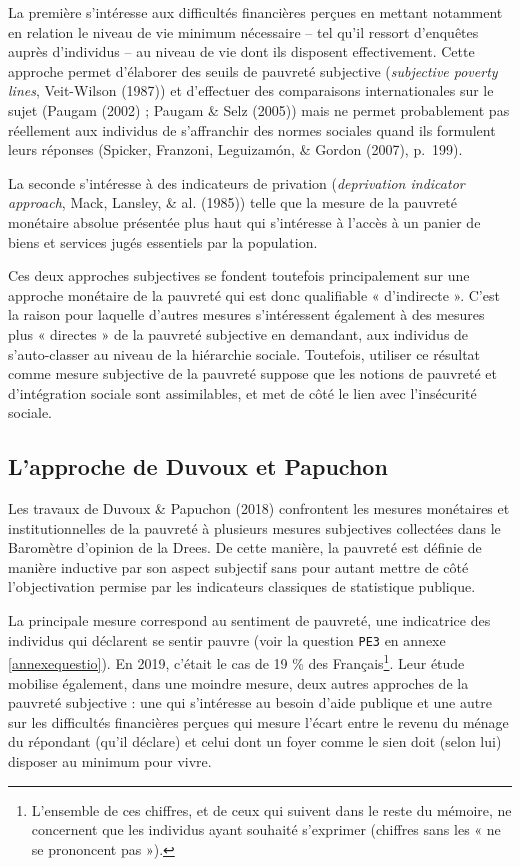 \documentclass[12pt,a4paper]{reedthesis}
\begin{document}
La première s'intéresse aux difficultés financières perçues en mettant notamment en relation le niveau de vie minimum nécessaire -- tel qu'il ressort d'enquêtes auprès d'individus -- au niveau de vie dont ils disposent effectivement. Cette approche permet d'élaborer des seuils de pauvreté subjective (\emph{subjective poverty lines}, Veit-Wilson (1987)) et d'effectuer des comparaisons internationales sur le sujet (Paugam (2002) ; Paugam \& Selz (2005)) mais ne permet probablement pas réellement aux individus de s'affranchir des normes sociales quand ils formulent leurs réponses (Spicker, Franzoni, Leguizamón, \& Gordon (2007), p.~199).

La seconde s'intéresse à des indicateurs de privation (\emph{deprivation indicator approach}, Mack, Lansley, \& al. (1985)) telle que la mesure de la pauvreté monétaire absolue présentée plus haut qui s'intéresse à l'accès à un panier de biens et services jugés essentiels par la population.

Ces deux approches subjectives se fondent toutefois principalement sur une approche monétaire de la pauvreté qui est donc qualifiable « d'indirecte ». C'est la raison pour laquelle d'autres mesures s'intéressent également à des mesures plus « directes » de la pauvreté subjective en demandant, aux individus de s'auto-classer au niveau de la hiérarchie sociale. Toutefois, utiliser ce résultat comme mesure subjective de la pauvreté suppose que les notions de pauvreté et d'intégration sociale sont assimilables, et met de côté le lien avec l'insécurité sociale.

\hypertarget{sec:approcheduvoux}{%
\subsection{L'approche de Duvoux et Papuchon}\label{sec:approcheduvoux}}

Les travaux de Duvoux \& Papuchon (2018) confrontent les mesures monétaires et institutionnelles de la pauvreté à plusieurs mesures subjectives collectées dans le Baromètre d'opinion de la Drees. De cette manière, la pauvreté est définie de manière inductive par son aspect subjectif sans pour autant mettre de côté l'objectivation permise par les indicateurs classiques de statistique publique.

La principale mesure correspond au sentiment de pauvreté, une indicatrice des individus qui déclarent se sentir pauvre (voir la question \texttt{PE3} en annexe \ref{annexequestio}). En 2019, c'était le cas de 19 \% des Français\footnote{L'ensemble de ces chiffres, et de ceux qui suivent dans le reste du mémoire, ne concernent que les individus ayant souhaité s'exprimer (chiffres sans les « ne se prononcent pas »).}. Leur étude mobilise également, dans une moindre mesure, deux autres approches de la pauvreté subjective : une qui s'intéresse au besoin d'aide publique et une autre sur les difficultés financières perçues qui mesure l'écart entre le revenu du ménage du répondant (qu'il déclare) et celui dont un foyer comme le sien doit (selon lui) disposer au minimum pour vivre.
\end{document}

